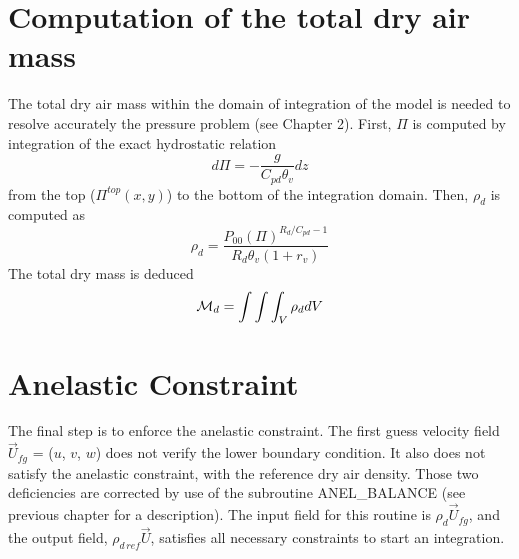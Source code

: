 \section{Computation of the total dry air mass}
The total dry air mass within the domain of integration of the model
is needed to resolve accurately the pressure problem (see Chapter 2).
First, $\Pi$ is computed by integration of the exact hydrostatic relation
\begin{equation}
d\Pi=-\frac{g}{C_{pd}\theta_v}dz
\end{equation}
from the top ($\Pi^{top}(x,y)$) to the bottom of the integration domain.
Then, $\rho_d$ is computed as
\begin{equation}
\label{eq:rhodd}
{\rho_d}=\frac{P_{00}(\Pi)^{R_d/C_{pd}-1}}
{R_d\theta_v(1+r_v)}
\end{equation}
The total dry mass is deduced
\begin{equation}
{\cal{M}}_d=\int\int\int_V\rho_ddV
\end{equation}

\section{Anelastic Constraint}

The final step is to enforce the anelastic constraint.
The first guess velocity field $\vec{U}_{fg}$ = ($u$, $v$, $w$) does not verify the lower
boundary condition. It also does not satisfy the anelastic
constraint, with the reference dry air density. Those two deficiencies are
corrected by use of the subroutine ANEL\_BALANCE (see previous
chapter for a description). The input field for this routine is
$\rho_d \vec{U}_{fg}$, and the output field, $\rho_{d\,ref} \vec{U}$,
satisfies all necessary constraints to start an integration.


%
%
